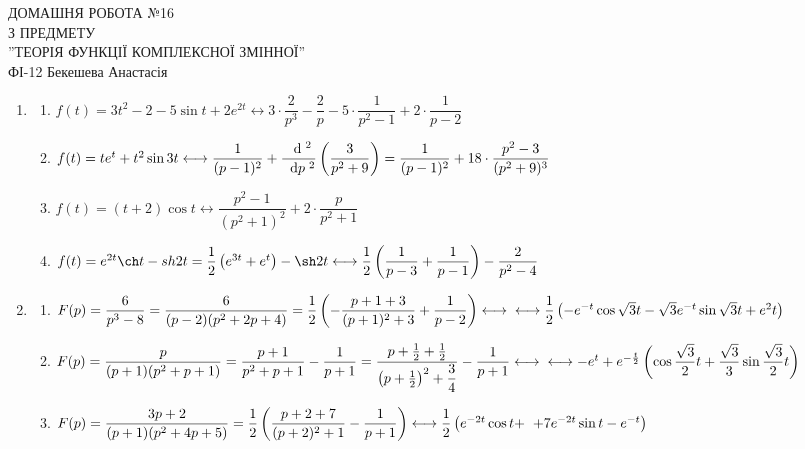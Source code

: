 \documentclass[a4paper,12pt]{article}
\newcommand\dx[1]{\hspace*{0.2cm}\textrm{d}{#1}\hspace*{0.1cm}}
\begin{document}
	\begin{justify}
		\thispagestyle{empty}\setlength{\parindent}{0pt}
 		\vspace*{\fill}
  		\begin{center}
  			\noindent\makebox[\linewidth]{\rule{\paperwidth}{0.4pt}}
   			\LARGE{\bigbreak ДОМАШНЯ РОБОТА №16\\З ПРЕДМЕТУ\\''ТЕОРІЯ ФУНКЦІЇ КОМПЛЕКСНОЇ ЗМІННОЇ''\\\bigbreak} 
   			ФІ-12 Бекешева Анастасія 
   			\noindent\makebox[\linewidth]{\rule{\paperwidth}{0.4pt}}
  		\end{center}
 		\vspace*{\fill}\newpage
 		\begin{enumerate}
 			\item \begin{enumerate}
 				\item $f(t)=3t^2-2-5\sin t+2e^{2t}\longleftrightarrow 3\cdot\dfrac{2}{p^3}-\dfrac2p-5\cdot\dfrac{1}{p^2-1}+2\cdot\dfrac1{p-2}$ 
 				\item $f(t)=te^t+t^2\sin3t\longleftrightarrow\dfrac{1}{(p-1)^2}+\dfrac{\dx{}^2}{\dx{p}^2}\left(\dfrac{3}{p^2+9}\right)=\dfrac{1}{(p-1)^2}+18\cdot\dfrac{p^2-3}{(p^2+9)^3}$
 				\item $f(t)=(t+2)\cos t\longleftrightarrow\dfrac{p^2-1}{(p^2+1)^2}+2\cdot\dfrac{p}{p^2+1}$
 				\item $f(t)=e^{2t}\ch t-sh2t=\dfrac12\left(e^{3t}+e^t\right)-\sh2t \longleftrightarrow\dfrac12\left(\dfrac1{p-3}+\dfrac1{p-1}\right)-\dfrac{2}{p^2-4}$
 			\end{enumerate}
 			\item \begin{enumerate}
 				\item $F(p)=\dfrac{6}{p^3-8}=\dfrac{6}{(p-2)(p^2+2p+4)}=\dfrac12\left(-\dfrac{p+1+3}{(p+1)^2+3}+\dfrac1{p-2}\right)\longleftrightarrow\\\longleftrightarrow \dfrac12\left(-e^{-t}\cos\sqrt3t-\sqrt3e^{-t}\sin\sqrt3t+e^2t\right)$
 				\item $F(p)=\dfrac{p}{(p+1)(p^2+p+1)}=\dfrac{p+1}{p^2+p+1}-\dfrac{1}{p+1}=\dfrac{p+\frac12+\frac12}{\left(p+\frac12\right)^2+\dfrac34}-\dfrac{1}{p+1}\longleftrightarrow\\\longleftrightarrow-e^t+e^{-\frac t2}\left(\cos\dfrac{\sqrt3}2t+\dfrac{\sqrt3}3\sin\dfrac{\sqrt3}2t\right)$
 				\item $F(p)=\dfrac{3p+2}{(p+1)(p^2+4p+5)}=\dfrac12\left(\dfrac{p+2+7}{(p+2)^2+1}-\dfrac1{p+1}\right)\longleftrightarrow\dfrac12\left(e^{-2t}\cos t+\right.\\\left.+7e^{-2t}\sin t-e^{-t}\right)$

\end{enumerate}
\end{enumerate}
\end{justify}
\end{document}

